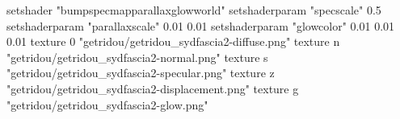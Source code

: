 setshader "bumpspecmapparallaxglowworld"
setshaderparam "specscale" 0.5
setshaderparam "parallaxscale" 0.01 0.01
setshaderparam "glowcolor" 0.01 0.01 0.01
texture 0 "getridou/getridou_sydfascia2-diffuse.png"
texture n "getridou/getridou_sydfascia2-normal.png"
texture s "getridou/getridou_sydfascia2-specular.png"
texture z "getridou/getridou_sydfascia2-displacement.png"
texture g "getridou/getridou_sydfascia2-glow.png"
